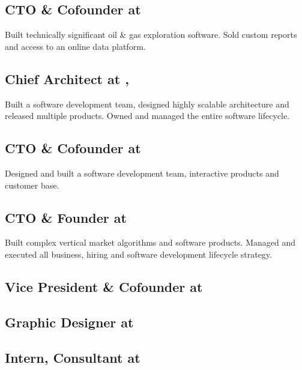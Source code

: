 \fullwidthmode
{
\subsection{\textbf{CTO \& Cofounder} at  \shyears{[2011-PRESENT]}}
\small{Built technically significant oil \& gas exploration software.  Sold custom reports and access to an online data platform.}
\medskip

\subsection{\textbf{Chief Architect} at ,  \shyears{[2008-2014]}}
\small{Built a software development team, designed highly scalable architecture and released multiple products.  Owned and managed the entire software lifecycle.}
\medskip

\subsection{\textbf{CTO \& Cofounder} at  \shyears{[2006-2008]}}
\small{Designed and built a software development team, interactive products and customer base.}
\medskip

\subsection{\textbf{CTO \& Founder} at  \shyears{[1997-2008]}}
\small{Built complex vertical market algorithms and software products.  Managed and executed all business, hiring and software development lifecycle strategy.}
\medskip

\subsection{\textbf{Vice President \& Cofounder} at  \shyears{[1995-1999]}}
\smallskip

\subsection{\textbf{Graphic Designer} at   \shyears{[1993-1995]}}
\smallskip

\subsection{\textbf{Intern, Consultant} at  \shyears{[1990-1993]}}
}
\smallskip
